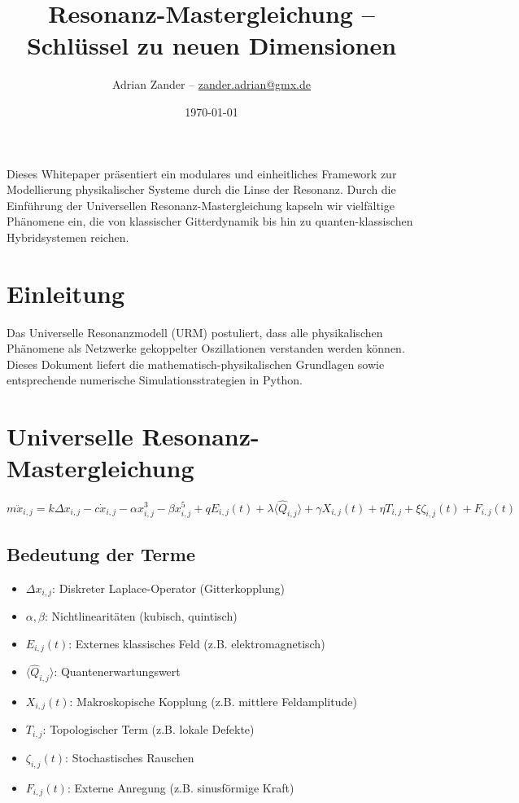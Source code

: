 \documentclass[12pt]{article}
\title{\textbf{Resonanz-Mastergleichung -- Schlüssel zu neuen Dimensionen}}
\author{Adrian Zander -- \href{mailto:zander.adrian@gmx.de}{zander.adrian@gmx.de}}
\date{\today}
\begin{document}
\maketitle

\begin{sloppypar}
Dieses Whitepaper präsentiert ein modulares und einheitliches Framework zur Modellierung physikalischer Systeme durch die Linse der Resonanz. Durch die Einführung der Universellen Resonanz-Mastergleichung kapseln wir vielfältige Phänomene ein, die von klassischer Gitterdynamik bis hin zu quanten-klassischen Hybridsystemen reichen.
\end{sloppypar}

\clearpage

\section*{Einleitung}
Das Universelle Resonanzmodell (URM) postuliert, dass alle physikalischen Phänomene als Netzwerke gekoppelter Oszillationen verstanden werden können. Dieses Dokument liefert die mathematisch-physikalischen Grundlagen sowie entsprechende numerische Simulationsstrategien in Python.

\section*{Universelle Resonanz-Mastergleichung}
\begin{dmath}
m \ddot{x}_{i,j} = k \Delta x_{i,j} - c \dot{x}_{i,j} - \alpha x_{i,j}^3 - \beta x_{i,j}^5 + q E_{i,j}(t) + \lambda \langle \hat{Q}_{i,j} \rangle + \gamma X_{i,j}(t) + \eta T_{i,j} + \xi \zeta_{i,j}(t) + F_{i,j}(t)
\end{dmath}

\subsection*{Bedeutung der Terme}
\begin{itemize}
\item $\Delta x_{i,j}$: Diskreter Laplace-Operator (Gitterkopplung)
\item $\alpha, \beta$: Nichtlinearitäten (kubisch, quintisch)
\item $E_{i,j}(t)$: Externes klassisches Feld (z.B. elektromagnetisch)
\item $\langle \hat{Q}_{i,j} \rangle$: Quantenerwartungswert
\item $X_{i,j}(t)$: Makroskopische Kopplung (z.B. mittlere Feldamplitude)
\item $T_{i,j}$: Topologischer Term (z.B. lokale Defekte)
\item $\zeta_{i,j}(t)$: Stochastisches Rauschen
\item $F_{i,j}(t)$: Externe Anregung (z.B. sinusförmige Kraft)
\end{itemize}
\end{document}
